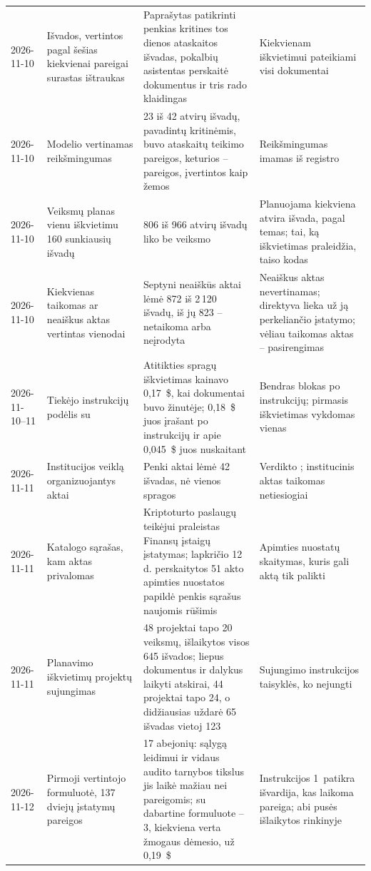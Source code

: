 \begin{xltabular}{\textwidth}{@{}L{17mm}L{37mm}YL{37mm}@{}}
2026-11-10 & Išvados, vertintos pagal šešias kiekvienai pareigai surastas ištraukas & Paprašytas patikrinti penkias kritines tos dienos ataskaitos išvadas, pokalbių asistentas perskaitė dokumentus ir tris rado klaidingas & Kiekvienam iškvietimui pateikiami visi dokumentai \\
2026-11-10 & Modelio vertinamas reikšmingumas & 23 iš 42 atvirų išvadų, pavadintų kritinėmis, buvo ataskaitų teikimo pareigos, keturios -- pareigos, įvertintos kaip žemos & Reikšmingumas imamas iš registro \\
2026-11-10 & Veiksmų planas vienu iškvietimu 160 sunkiausių išvadų & 806 iš 966 atvirų išvadų liko be veiksmo & Planuojama kiekviena atvira išvada, pagal temas; tai, ką iškvietimas praleidžia, taiso kodas \\
2026-11-10 & Kiekvienas taikomas ar neaiškus aktas vertintas vienodai & Septyni neaiškūs aktai lėmė 872 iš 2\,120 išvadų, iš jų 823 -- netaikoma arba neįrodyta & Neaiškus aktas nevertinamas; direktyva lieka už ją perkeliančio įstatymo; vėliau taikomas aktas -- pasirengimas \\
2026-11-10--11 & Tiekėjo instrukcijų podėlis su  & Atitikties spragų iškvietimas kainavo 0,17~\$, kai dokumentai buvo žinutėje; 0,18~\$ juos įrašant po instrukcijų ir apie 0,045~\$ juos nuskaitant & Bendras blokas po instrukcijų; pirmasis iškvietimas vykdomas vienas \\
2026-11-11 & Institucijos veiklą organizuojantys aktai & Penki aktai lėmė 42 išvadas, nė vienos spragos & Verdikto ; institucinis aktas taikomas netiesiogiai \\
2026-11-11 & Katalogo sąrašas, kam aktas privalomas & Kriptoturto paslaugų teikėjui praleistas Finansų įstaigų įstatymas; lapkričio 12 d. perskaitytos 51 akto apimties nuostatos papildė penkis sąrašus naujomis rūšimis & Apimties nuostatų skaitymas, kuris gali aktą tik palikti \\
2026-11-11 & Planavimo iškvietimų projektų sujungimas & 48 projektai tapo 20 veiksmų, išlaikytos visos 645 išvados; liepus dokumentus ir dalykus laikyti atskirai, 44 projektai tapo 24, o didžiausias uždarė 65 išvadas vietoj 123 & Sujungimo instrukcijos taisyklės, ko nejungti \\
2026-11-12 & Pirmoji vertintojo formuluotė, 137 dviejų įstatymų pareigos & 17 abejonių: sąlygą leidimui ir vidaus audito tarnybos tikslus jis laikė mažiau nei pareigomis; su dabartine formuluote -- 3, kiekviena verta žmogaus dėmesio, už 0,19~\$ & Instrukcijos 1~patikra išvardija, kas laikoma pareiga; abi pusės išlaikytos rinkinyje  \\

\end{xltabular}
